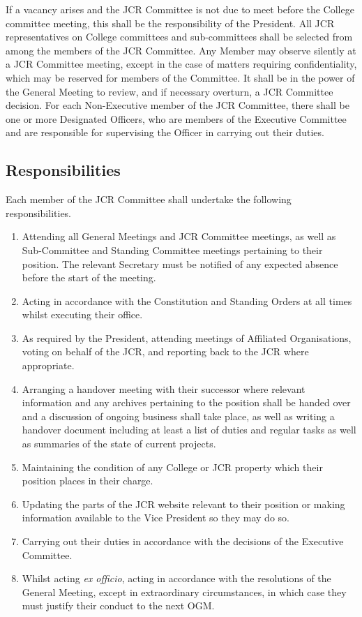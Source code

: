 If a vacancy arises and the JCR Committee is not due to meet before the College committee meeting, this shall be the responsibility of the President.
All JCR representatives on College committees and sub-committees shall be selected from among the members of the JCR Committee.
\npara Any Member may observe silently at a JCR Committee meeting, except in the case of matters requiring confidentiality, which may be reserved for members of the Committee.
\npara It shall be in the power of the General Meeting to review, and if necessary overturn, a JCR Committee decision.
\npara For each Non-Executive member of the JCR Committee, there shall be one or more Designated Officers, who are members of the Executive Committee and are responsible for supervising the Officer in carrying out their duties.
\subsection{Responsibilities}
\npara \label{resp:general} Each member of the JCR Committee shall undertake the following responsibilities.
\begin{enumerate}
	\item Attending all General Meetings and JCR Committee meetings, as well as Sub-Committee and Standing Committee meetings pertaining to their position. The relevant Secretary must be notified of any expected absence before the start of the meeting.
	\item Acting in accordance with the Constitution and Standing Orders at all times whilst executing their office.
	\item As required by the President, attending meetings of Affiliated Organisations, voting on behalf of the JCR, and reporting back to the JCR where appropriate.
	\item \label{SC:handover} Arranging a handover meeting with their successor where relevant information and any archives pertaining to the position shall be handed over and a discussion of ongoing business shall take place, as well as writing a handover document including at least a list of duties and regular tasks as well as summaries of the state of current projects.
	\item Maintaining the condition of any College or JCR property which their position places in their charge.
	\item Updating the parts of the JCR website relevant to their position or making information available to the Vice President so they may do so.
	\item Carrying out their duties in accordance with the decisions of the Executive Committee.
	\item Whilst acting \textit{ex officio}, acting in accordance with the resolutions of the General Meeting, except in extraordinary circumstances, in which case they must justify their conduct to the next OGM.
\end{enumerate}

